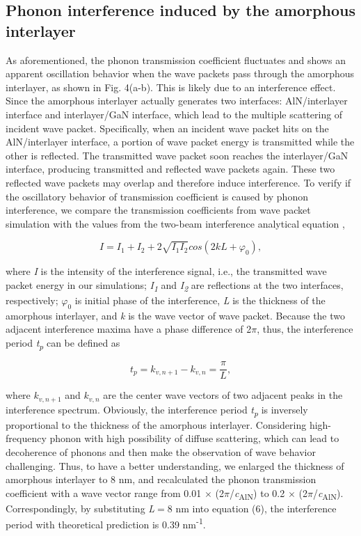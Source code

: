 \documentclass{article}
\begin{document}
\subsection{Phonon interference induced by the amorphous interlayer}

As aforementioned, the phonon transmission coefficient fluctuates and shows an apparent oscillation behavior when the wave packets pass through the amorphous interlayer, as shown in Fig. 4(a-b). This is likely due to an interference effect. Since the amorphous interlayer actually generates two interfaces: AlN/interlayer interface and interlayer/GaN interface, which lead to the multiple scattering of incident wave packet. Specifically, when an incident wave packet hits on the AlN/interlayer interface, a portion of wave packet energy is transmitted while the other is reflected. The transmitted wave packet soon reaches the interlayer/GaN interface, producing transmitted and reflected wave packets again. These two reflected wave packets may overlap and therefore induce interference. To verify if the oscillatory behavior of transmission coefficient is caused by phonon interference, we compare the transmission coefficients from wave packet simulation with the values from the two-beam interference analytical equation  \cite{liang2017phonon}, 

\begin{equation}
I = I_{1}+I_{2}+2\sqrt{I_{1}I_{2}}cos(2kL+\varphi_{0}),
\end{equation}

where \textit{I} is the intensity of the interference signal, i.e., the transmitted wave packet energy in our simulations; \textit{I\textsubscript{1}} and \textit{I\textsubscript{2}} are reflections at the two interfaces, respectively; \( \varphi_{0}\) is initial phase of the interference, \textit{L} is the thickness of the amorphous interlayer, and \textit{k} is the wave vector of wave packet. Because the two adjacent interference maxima have a phase difference of 2\textit{$\pi$}, thus, the interference period \textit{t\textsubscript{p}} can be defined as 

\begin{equation}
t_{p} = k_{v,n+1}-k_{v,n} =\frac{\pi}{L},
\end{equation}

where \( k_{v,n+1}\) and \( k_{v, n}\) are the center wave vectors of two adjacent peaks in the interference spectrum. Obviously, the interference period \textit{t\textsubscript{p}} is inversely proportional to the thickness of the amorphous interlayer. Considering high-frequency phonon with high possibility of diffuse scattering, which can lead to decoherence of phonons and then make the observation of wave behavior challenging. Thus, to have a better understanding, we enlarged the thickness of amorphous interlayer to 8 nm, and recalculated the phonon transmission coefficient with a wave vector range from 0.01 $\times$ (2$\pi$/\textit{c}\textsubscript{AlN}) to 0.2 $\times$ (2$\pi$/\textit{c}\textsubscript{AlN}). Correspondingly, by substituting \textit{L}$=$8 nm into equation (6), the interference period with theoretical prediction is 0.39 nm\textsuperscript{-1}.
\end{document}
